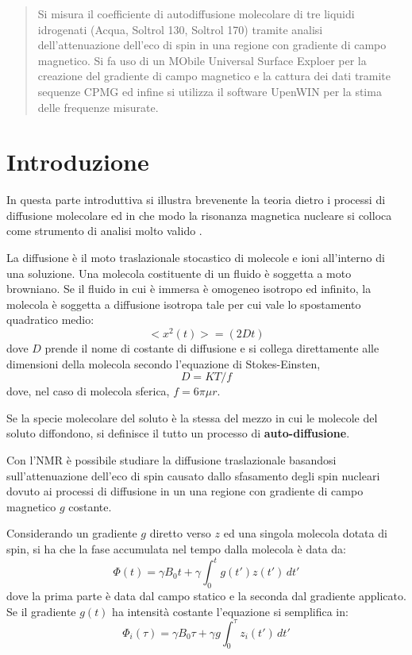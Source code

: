 \maketitle

\begin{abstract}
Si misura il coefficiente di autodiffusione molecolare di tre liquidi idrogenati (Acqua, Soltrol 130, Soltrol 170) tramite analisi dell'attenuazione dell'eco di spin in una regione con gradiente di campo magnetico. Si fa uso di un MObile Universal Surface Exploer per la creazione del gradiente di campo magnetico e la cattura dei dati tramite sequenze CPMG ed infine si utilizza il software UpenWIN per la stima delle frequenze misurate.
\end{abstract}

\section*{Introduzione}

In questa parte introduttiva si illustra brevenente la teoria dietro i processi di diffusione molecolare ed in che modo la risonanza magnetica nucleare si colloca come strumento di analisi molto valido \cite{website}.

La diffusione è il moto traslazionale stocastico di molecole e ioni all'interno di una soluzione. Una molecola costituente di un fluido è soggetta a moto browniano. Se il fluido in cui è immersa è omogeneo isotropo ed infinito, la molecola è soggetta a diffusione isotropa tale per cui vale lo spostamento quadratico medio:
\begin{equation}
	<x^2(t)> = (2Dt)
\end{equation}
dove $D$ prende il nome di costante di diffusione e si collega direttamente alle dimensioni della molecola secondo l'equazione di Stokes-Einsten,
\begin{equation}
	D = KT/f
\end{equation}
dove, nel caso di molecola sferica, $f = 6\pi\mu r$.

Se la specie molecolare del soluto è la stessa del mezzo in cui le molecole del soluto diffondono, si definisce il tutto un processo di \textbf{auto-diffusione}.

Con l'NMR è possibile studiare la diffusione traslazionale basandosi sull'attenuazione dell'eco di spin causato dallo sfasamento degli spin nucleari dovuto ai processi di diffusione in un una regione con gradiente di campo magnetico $g$ costante.

Considerando un gradiente $g$ diretto verso $z$ ed una singola molecola dotata di spin, si ha che la fase accumulata nel tempo dalla molecola è data da:
\begin{equation}
	\Phi(t) = \gamma B_0 t + \gamma \int_0^t g(t')z(t')\,dt'
\end{equation}
dove la prima parte è data dal campo statico e la seconda dal gradiente applicato. Se il gradiente $g(t)$ ha intensità costante l'equazione si semplifica in:
\begin{equation}
	\Phi_i(\tau) = \gamma B_0 \tau + \gamma g \int_{0}^{\tau}z_i(t')\,dt'
\end{equation}

